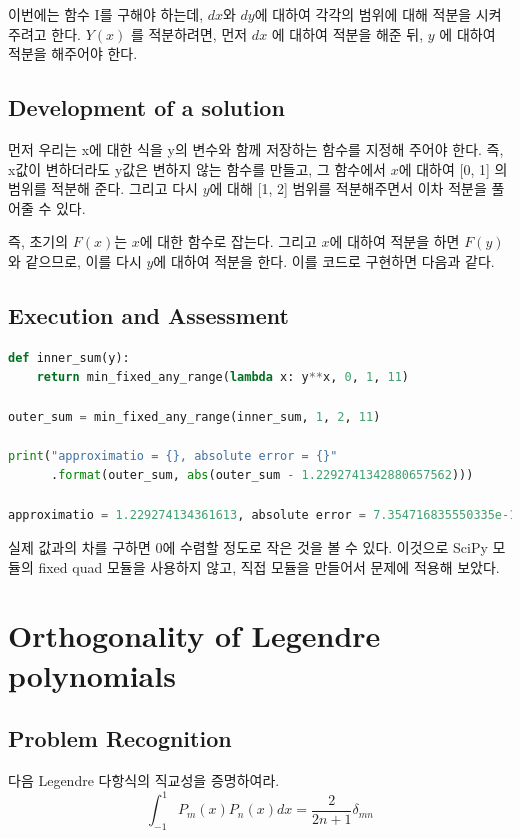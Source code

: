\documentclass[11pt]{article}
\begin{document}
이번에는 함수 I를 구해야 하는데, $dx$와 $dy$에 대하여 각각의 범위에 대해 적분을 시켜주려고 한다. $Y(x)$ 를 적분하려면, 먼저 $dx$ 에 대하여 적분을 해준 뒤, $y$ 에 대하여 적분을 해주어야 한다.

\subsection{Development of a solution} 

먼저 우리는 x에 대한 식을 y의 변수와 함께 저장하는 함수를 지정해 주어야 한다. 즉, x값이 변하더라도 y값은 변하지 않는 함수를 만들고, 그 함수에서 $x$에 대하여 [0, 1] 의 범위를 적분해 준다. 그리고 다시 $y$에 대해 [1, 2] 범위를 적분해주면서 이차 적분을 풀어줄 수 있다.
 
 즉, 초기의 $F(x)$는 $x$에 대한 함수로 잡는다. 그리고 $x$에 대하여 적분을 하면 $F(y)$와 같으므로, 이를 다시 $y$에 대하여 적분을 한다. 이를 코드로 구현하면 다음과 같다.

\subsection{Execution and Assessment}
\begin{lstlisting}[language=Python]
def inner_sum(y):
    return min_fixed_any_range(lambda x: y**x, 0, 1, 11)
    
outer_sum = min_fixed_any_range(inner_sum, 1, 2, 11)

print("approximatio = {}, absolute error = {}"
      .format(outer_sum, abs(outer_sum - 1.2292741342880657562)))
     
approximatio = 1.229274134361613, absolute error = 7.354716835550335e-11
        \end{lstlisting}
실제 값과의 차를 구하면 0에 수렴할 정도로 작은 것을 볼 수 있다.  이것으로 SciPy 모듈의 fixed quad 모듈을 사용하지 않고, 직접 모듈을 만들어서 문제에 적용해 보았다.

\pagebreak
















\section{Orthogonality of Legendre polynomials}
\subsection{Problem Recognition} 
다음 Legendre 다항식의 직교성을 증명하여라.
\begin{equation}
\int_{-1}^1 P_m(x) P_n(x) dx = \frac{2}{2n + 1} \delta_{mn}
    \end{equation}
\end{document}
